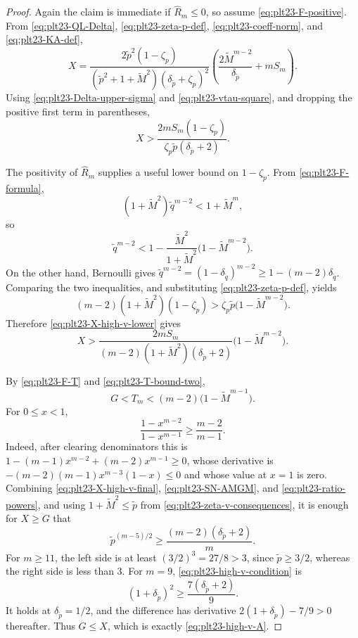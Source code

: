 ﻿\documentclass[11pt]{article}
\numberwithin{equation}{section}
\begin{document}
\begin{proof}
  Again the claim is immediate if $\widehat R_m\le0$, so assume \eqref{eq:plt23-F-positive}.
  From \eqref{eq:plt23-QL-Delta}, \eqref{eq:plt23-zeta-p-def}, \eqref{eq:plt23-coeff-norm}, and \eqref{eq:plt23-KA-def},
  \[
    X
    =\frac{2\tilde p^2(1-\zeta_p)}
          {(\tilde p^2+1+\tilde M^2)(\delta_{\tilde p}+\zeta_p)^2}
     \left(
       \frac{2\tilde M^{m-2}}{\delta_{\tilde p}}+mS_m
     \right).
  \]
  Using \eqref{eq:plt23-Delta-upper-sigma} and \eqref{eq:plt23-vtau-square}, and dropping the positive first term in parentheses,
  \begin{equation}\label{eq:plt23-X-high-v-lower}
    X>
    \frac{2mS_m(1-\zeta_p)}{\zeta_p\tilde p(\delta_{\tilde p}+2)}.
  \end{equation}

  The positivity of $\widehat R_m$ supplies a useful lower bound on $1-\zeta_p$.
  From \eqref{eq:plt23-F-formula},
  \[
    (1+\tilde M^2)\tilde q^{m-2}<1+\tilde M^{m},
  \]
  so
  \[
    \tilde q^{m-2}
    <1-\frac{\tilde M^2}{1+\tilde M^2}\bigl(1-\tilde M^{m-2}\bigr).
  \]
  On the other hand, Bernoulli gives $\tilde q^{m-2}=(1-\delta_{\tilde q})^{m-2}\ge1-(m-2)\delta_{\tilde q}$.
  Comparing the two inequalities, and substituting \eqref{eq:plt23-zeta-p-def}, yields
  \[
    (m-2)(1+\tilde M^2)(1-\zeta_p)
    >\zeta_p\tilde p\bigl(1-\tilde M^{m-2}\bigr).
  \]
  Therefore \eqref{eq:plt23-X-high-v-lower} gives
  \begin{equation}\label{eq:plt23-X-high-v-final}
    X>
    \frac{2mS_m}{(m-2)(1+\tilde M^2)(\delta_{\tilde p}+2)}
    \bigl(1-\tilde M^{m-2}\bigr).
  \end{equation}

  By \eqref{eq:plt23-F-T} and \eqref{eq:plt23-T-bound-two},
  \begin{equation}\label{eq:plt23-G-high-v}
    G<T_m<(m-2)\bigl(1-\tilde M^{m-1}\bigr).
  \end{equation}
  For $0\le x<1$,
  \begin{equation}\label{eq:plt23-ratio-powers}
    \frac{1-x^{m-2}}{1-x^{m-1}}\ge\frac{m-2}{m-1}.
  \end{equation}
  Indeed, after clearing denominators this is $1-(m-1)x^{m-2}+(m-2)x^{m-1}\ge0$, whose derivative is $-(m-2)(m-1)x^{m-3}(1-x)\le0$ and whose value at $x=1$ is zero.
  Combining \eqref{eq:plt23-X-high-v-final}, \eqref{eq:plt23-SN-AMGM}, and \eqref{eq:plt23-ratio-powers}, and using $1+\tilde M^2\le\tilde p$ from \eqref{eq:plt23-zeta-v-consequences}, it is enough for $X\ge G$ that
  \begin{equation}\label{eq:plt23-high-v-condition}
    \tilde p^{(m-5)/2}
    \ge\frac{(m-2)(\delta_{\tilde p}+2)}{m}.
  \end{equation}
  For $m\ge11$, the left side is at least $(3/2)^3=27/8>3$, since $\tilde p\ge3/2$, whereas the right side is less than $3$.
  For $m=9$, \eqref{eq:plt23-high-v-condition} is
  \[
    (1+\delta_{\tilde p})^2\ge\frac{7(\delta_{\tilde p}+2)}9.
  \]
  It holds at $\delta_{\tilde p}=1/2$, and the difference has derivative $2(1+\delta_{\tilde p})-7/9>0$ thereafter.
  Thus $G\le X$, which is exactly \eqref{eq:plt23-high-v-A}.
\end{proof}
\end{document}
